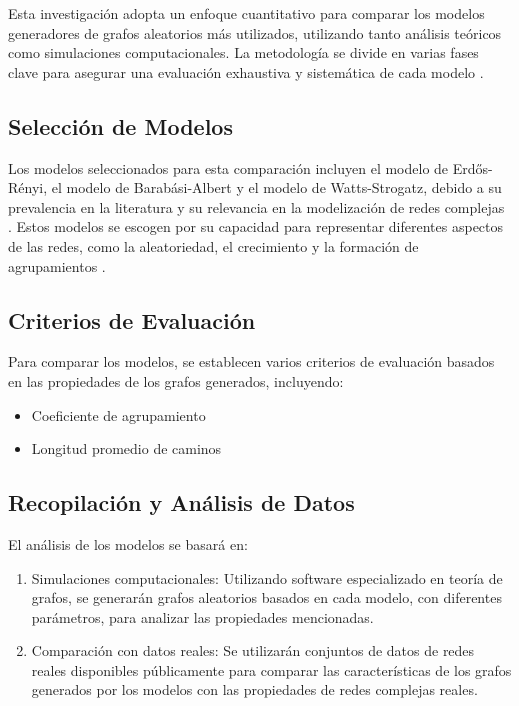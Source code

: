 Esta investigación adopta un enfoque cuantitativo para comparar los modelos generadores de grafos aleatorios más utilizados, utilizando tanto análisis teóricos como simulaciones computacionales. La metodología se divide en varias fases clave para asegurar una evaluación exhaustiva y sistemática de cada modelo .

\subsection{Selección de Modelos}

Los modelos seleccionados para esta comparación incluyen el modelo de Erdős-Rényi, el modelo de Barabási-Albert y el modelo de Watts-Strogatz, debido a su prevalencia en la literatura y su relevancia en la modelización de redes complejas . Estos modelos se escogen por su capacidad para representar diferentes aspectos de las redes, como la aleatoriedad, el crecimiento y la formación de agrupamientos .

\subsection{Criterios de Evaluación}

Para comparar los modelos, se establecen varios criterios de evaluación basados en las propiedades de los grafos generados, incluyendo:
\begin{itemize}
    \item Coeficiente de agrupamiento
    \item Longitud promedio de caminos
\end{itemize}

\subsection{Recopilación y Análisis de Datos}

El análisis de los modelos se basará en:
\begin{enumerate}
    \item Simulaciones computacionales: Utilizando software especializado en teoría de grafos, se generarán grafos aleatorios basados en cada modelo, con diferentes parámetros, para analizar las propiedades mencionadas.
    \item Comparación con datos reales: Se utilizarán conjuntos de datos de redes reales disponibles públicamente para comparar las características de los grafos generados por los modelos con las propiedades de redes complejas reales.
\end{enumerate}

